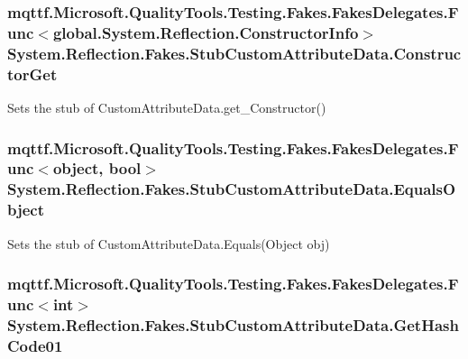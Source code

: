 \hypertarget{class_system_1_1_reflection_1_1_fakes_1_1_stub_custom_attribute_data_af16200d66ee56933559022459f2dca6a}{
\subsubsection[{Constructor\-Get}]{\setlength{\rightskip}{0pt plus 5cm}mqttf.\-Microsoft.\-Quality\-Tools.\-Testing.\-Fakes.\-Fakes\-Delegates.\-Func$<$global.\-System.\-Reflection.\-Constructor\-Info$>$ System.\-Reflection.\-Fakes.\-Stub\-Custom\-Attribute\-Data.\-Constructor\-Get}}\label{class_system_1_1_reflection_1_1_fakes_1_1_stub_custom_attribute_data_af16200d66ee56933559022459f2dca6a}


Sets the stub of Custom\-Attribute\-Data.\-get\-\_\-\-Constructor()

\hypertarget{class_system_1_1_reflection_1_1_fakes_1_1_stub_custom_attribute_data_a1d6da7cba62ad409929160378acc9ef3}{
\subsubsection[{Equals\-Object}]{\setlength{\rightskip}{0pt plus 5cm}mqttf.\-Microsoft.\-Quality\-Tools.\-Testing.\-Fakes.\-Fakes\-Delegates.\-Func$<$object, bool$>$ System.\-Reflection.\-Fakes.\-Stub\-Custom\-Attribute\-Data.\-Equals\-Object}}\label{class_system_1_1_reflection_1_1_fakes_1_1_stub_custom_attribute_data_a1d6da7cba62ad409929160378acc9ef3}


Sets the stub of Custom\-Attribute\-Data.\-Equals(\-Object obj)

\hypertarget{class_system_1_1_reflection_1_1_fakes_1_1_stub_custom_attribute_data_a003ffb3e791fd9fe297215212525081c}{
\subsubsection[{Get\-Hash\-Code01}]{\setlength{\rightskip}{0pt plus 5cm}mqttf.\-Microsoft.\-Quality\-Tools.\-Testing.\-Fakes.\-Fakes\-Delegates.\-Func$<$int$>$ System.\-Reflection.\-Fakes.\-Stub\-Custom\-Attribute\-Data.\-Get\-Hash\-Code01}}\label{class_system_1_1_reflection_1_1_fakes_1_1_stub_custom_attribute_data_a003ffb3e791fd9fe297215212525081c}


